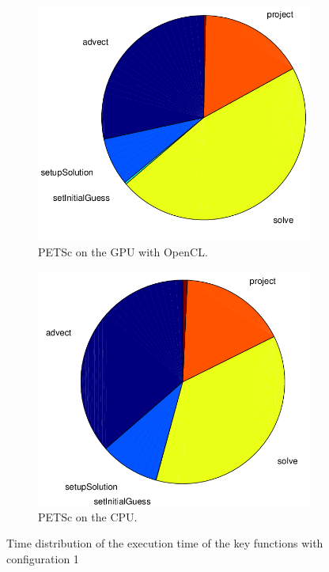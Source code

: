 \begin{figure}[ht]
	\center
	
	\begin{subfigure}{0.45\textwidth}
		\center
		\includegraphics[width=1.0\textwidth]{results/data/td/td_conf1_petsc_gpu}
		\caption{PETSc on the GPU with OpenCL.}
		\label{fig:td_conf1_petsc_gpu}
	\end{subfigure}
	\begin{subfigure}{0.45\textwidth}
		\center
		\includegraphics[width=1.0\textwidth]{results/data/td/td_conf1_petsc_cpu}
		\caption{PETSc on the CPU.}
		\label{fig:td_conf1_petsc_cpu}
	\end{subfigure}
	\caption{Time distribution of the execution time of the key functions
			with configuration 1}
	\label{fig:td_conf1}
	
\end{figure}

